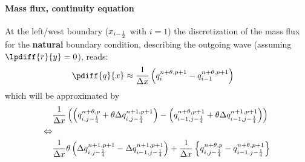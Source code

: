 \paragraph*{Mass flux, continuity equation}
At the left/west boundary ($x_{i-\frac{1}{2}}$ with $i=1$) the discretization of the mass flux for the \textbf{natural} boundary condition, describing the outgoing wave (assuming $\lpdiff{r}{y} = 0$), reads:
\begin{align}
    \pdiff{q}{x} & \approx \frac{1}{\Dx} \left(  q^{n+\theta, p+1}_{i} - q^{n+\theta, p+1}_{i-1} \right)
\end{align}
which will be approximated by
\begin{align}
    &\frac{1}{\Delta x} \left( \left( q^{n+\theta, p}_{i, j-\frac{1}{4}} + \theta \Delta q^{n+1, p+1}_{i, j-\frac{1}{4}}\right)
    - \left( q^{n+\theta, p+1}_{i-1, j-\frac{1}{4}} + \theta \Delta q^{n+1, p+1}_{i-1, j-\frac{1}{4}}\right) \right)
    \\
    \Leftrightarrow &
    \\
    &\frac{1 }{\Delta x} \theta \left( \Delta q^{n+1, p+1}_{i, j-\frac{1}{4}} - \Delta q^{n+1, p+1}_{i-1, j-\frac{1}{4}}\right) +
    \frac{1}{\Delta x} \left\{ q^{n+\theta, p}_{i, j-\frac{1}{4}} - q^{n+\theta, p+1}_{i-1, j-\frac{1}{4}} \right\}
\end{align}
